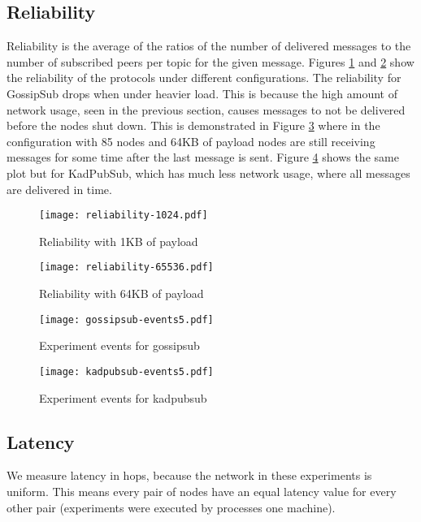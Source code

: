 \documentclass[sigconf]{acmart}
\begin{document}
\subsection{Reliability}
Reliability is the average of the ratios of the number of delivered messages to the number of subscribed peers per topic for the given message.
Figures \ref{fig:reliability-1024} and \ref{fig:reliability-65536} show the reliability of the protocols under different configurations.
The reliability for GossipSub drops when under heavier load. This is because the high amount of network usage, seen in the previous section, causes messages to not be delivered before the nodes shut down. This is demonstrated in Figure \ref{fig:gossipsub-events5} where in the configuration with 85 nodes and 64KB of payload nodes are still receiving messages for some time after the last message is sent. Figure \ref{fig:kadpubsub-events5} shows the same plot but for KadPubSub, which has much less network usage, where all messages are delivered in time.

\begin{figure}[htp]
    \centering
    \texttt{[image: reliability-1024.pdf]}
    \caption{Reliability with 1KB of payload}
    \label{fig:reliability-1024}
\end{figure}

\begin{figure}[htp]
    \centering
    \texttt{[image: reliability-65536.pdf]}
    \caption{Reliability with 64KB of payload}
    \label{fig:reliability-65536}
\end{figure}

\begin{figure}[htp]
    \centering
    \texttt{[image: gossipsub-events5.pdf]}
    \caption{Experiment events for gossipsub}
    \label{fig:gossipsub-events5}
\end{figure}

\begin{figure}[htp]
    \centering
    \texttt{[image: kadpubsub-events5.pdf]}
    \caption{Experiment events for kadpubsub}
    \label{fig:kadpubsub-events5}
\end{figure}

\subsection{Latency}
We measure latency in hops, because the network in these experiments is uniform. This means every pair of nodes have an equal latency value for every other pair (experiments were executed by processes one machine). 
\end{document}
